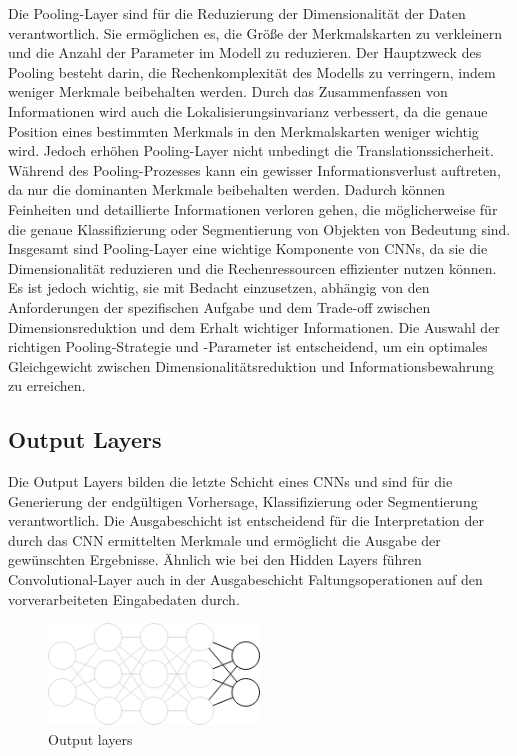     Die Pooling-Layer sind für die Reduzierung der Dimensionalität der Daten verantwortlich. 
    Sie ermöglichen es, die Größe der Merkmalskarten zu verkleinern und die Anzahl der Parameter im Modell zu reduzieren. 
    Der Hauptzweck des Pooling besteht darin, die Rechenkomplexität des Modells zu verringern, indem weniger Merkmale beibehalten werden. 
    Durch das Zusammenfassen von Informationen wird auch die Lokalisierungsinvarianz verbessert, da die genaue Position eines bestimmten Merkmals in den Merkmalskarten weniger wichtig wird.
    Jedoch erhöhen Pooling-Layer nicht unbedingt die Translationssicherheit. Während des Pooling-Prozesses kann ein gewisser Informationsverlust auftreten, da nur die dominanten Merkmale beibehalten werden. 
    Dadurch können Feinheiten und detaillierte Informationen verloren gehen, die möglicherweise für die genaue Klassifizierung oder Segmentierung von Objekten von Bedeutung sind.
    Insgesamt sind Pooling-Layer eine wichtige Komponente von \acp{CNN}, da sie die Dimensionalität reduzieren und die Rechenressourcen effizienter nutzen können. 
    Es ist jedoch wichtig, sie mit Bedacht einzusetzen, abhängig von den Anforderungen der spezifischen Aufgabe und dem Trade-off zwischen Dimensionsreduktion und dem Erhalt wichtiger Informationen. 
    Die Auswahl der richtigen Pooling-Strategie und -Parameter ist entscheidend, um ein optimales Gleichgewicht zwischen Dimensionalitätsreduktion und Informationsbewahrung zu erreichen.

\subsection{Output Layers}
    Die Output Layers bilden die letzte Schicht eines \acfp{CNN} und sind für die Generierung der endgültigen Vorhersage, Klassifizierung oder Segmentierung verantwortlich. 
    Die Ausgabeschicht ist entscheidend für die Interpretation der durch das \ac{CNN} ermittelten Merkmale und ermöglicht die Ausgabe der gewünschten Ergebnisse.
    Ähnlich wie bei den Hidden Layers führen Convolutional-Layer auch in der Ausgabeschicht Faltungsoperationen auf den vorverarbeiteten Eingabedaten durch. 

    \begin{figure}[h]
        \centering
        \includegraphics[width=0.5\textwidth]{img/output_layers.png}
        \caption{Output layers}
        \label{fig:output_layers}
    \end{figure}

